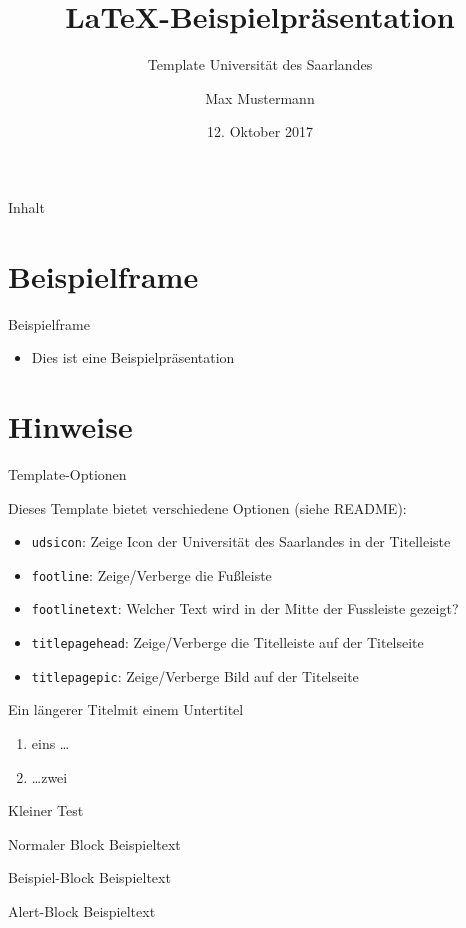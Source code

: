 \documentclass{beamer}
\author[Mustermann]{Max Mustermann}
\title{\LaTeX-Beispielpräsentation}
\subtitle{Template Universität des Saarlandes}
\institute[UdS]{Universität des Saarlandes}
\date[12.10.2017]{12. Oktober 2017}
\begin{document}
\begin{frame}
  \titlepage
\end{frame}

\begin{frame}{Inhalt}
  \tableofcontents
\end{frame}

\section{Beispielframe}

\begin{frame}{Beispielframe}
  \begin{itemize}
    \item Dies ist eine Beispielpräsentation
  \end{itemize}
\end{frame}

\section{Hinweise}

\begin{frame}{Template-Optionen}

  Dieses Template bietet verschiedene Optionen (siehe README):
	
	\begin{itemize}
    \item \texttt{udsicon}: Zeige Icon der Universität des Saarlandes in der
      Titelleiste
    \item \texttt{footline}: Zeige/Verberge die Fußleiste
    \item \texttt{footlinetext}: Welcher Text wird in der Mitte der Fussleiste
      gezeigt?
    \item \texttt{titlepagehead}: Zeige/Verberge die Titelleiste auf der
      Titelseite
    \item \texttt{titlepagepic}: Zeige/Verberge Bild auf der Titelseite
	\end{itemize}
	
\end{frame}

\begin{frame}{Ein längerer Titel}{mit einem Untertitel}
  \begin{enumerate}
    \item eins \ldots 
    \item \ldots zwei
  \end{enumerate}
\end{frame}

\begin{frame}{Kleiner Test}

  \begin{block}{Normaler Block}
    Beispieltext
  \end{block}

  \begin{exampleblock}{Beispiel-Block}
    Beispieltext
  \end{exampleblock}

  \begin{alertblock}{Alert-Block}
    Beispieltext
  \end{alertblock}

\end{frame}
\end{document}
